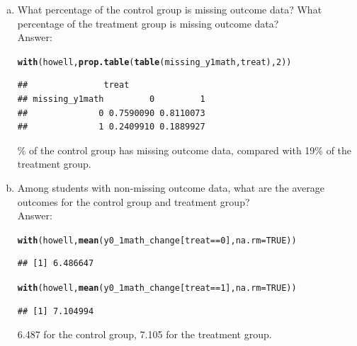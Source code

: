 \documentclass[11pt,notitlepage]{article}\usepackage[]{graphicx}\usepackage[]{color}
\makeatletter
\newcommand{\hlnum}[1]{\textcolor[rgb]{0.686,0.059,0.569}{#1}}%
\newcommand{\hlopt}[1]{\textcolor[rgb]{0,0,0}{#1}}%
\newcommand{\hlstd}[1]{\textcolor[rgb]{0.345,0.345,0.345}{#1}}%
\newcommand{\hlkwc}[1]{\textcolor[rgb]{0.333,0.667,0.333}{#1}}%
\newcommand{\hlkwd}[1]{\textcolor[rgb]{0.737,0.353,0.396}{\textbf{#1}}}%
\newenvironment{kframe}{%
 \def\at@end@of@kframe{}%
 \ifinner\ifhmode%
  \def\at@end@of@kframe{\end{minipage}}%
  \begin{minipage}{\columnwidth}%
 \fi\fi%
 \def\FrameCommand##1{\hskip\@totalleftmargin \hskip-\fboxsep
 \colorbox{shadecolor}{##1}\hskip-\fboxsep
     \hskip-\linewidth \hskip-\@totalleftmargin \hskip\columnwidth}%
 \MakeFramed {\advance\hsize-\width
   \@totalleftmargin\z@ \linewidth\hsize
   \@setminipage}}%
 {\par\unskip\endMakeFramed%
 \at@end@of@kframe}
\newenvironment{knitrout}{}{} %
\makeatother
\begin{document}
\begin{enumerate}[a)]
\item What percentage of the control group is missing outcome data? What percentage of the treatment group is missing outcome data?\\
Answer:\\
\begin{knitrout}
\color{fgcolor}\begin{kframe}
\begin{alltt}
\hlkwd{with}\hlstd{(howell,}\hlkwd{prop.table}\hlstd{(}\hlkwd{table}\hlstd{(missing_y1math, treat),} \hlnum{2}\hlstd{))}
\end{alltt}
\begin{verbatim}
##               treat
## missing_y1math         0         1
##              0 0.7590090 0.8110073
##              1 0.2409910 0.1889927
\end{verbatim}
\end{kframe}
\end{knitrout}
24\% of the control group has missing outcome data, compared with 19\% of the treatment group.

\item Among students with non-missing outcome data, what are the average outcomes for the control group and treatment group?\\
Answer:\\
\begin{knitrout}
\color{fgcolor}\begin{kframe}
\begin{alltt}
\hlkwd{with}\hlstd{(howell,} \hlkwd{mean}\hlstd{(y0_1math_change[treat}\hlopt{==}\hlnum{0}\hlstd{],}\hlkwc{na.rm}\hlstd{=}\hlnum{TRUE}\hlstd{))}
\end{alltt}
\begin{verbatim}
## [1] 6.486647
\end{verbatim}
\begin{alltt}
\hlkwd{with}\hlstd{(howell,} \hlkwd{mean}\hlstd{(y0_1math_change[treat}\hlopt{==}\hlnum{1}\hlstd{],}\hlkwc{na.rm}\hlstd{=}\hlnum{TRUE}\hlstd{))}
\end{alltt}
\begin{verbatim}
## [1] 7.104994
\end{verbatim}
\end{kframe}
\end{knitrout}


6.487 for the control group, 7.105 for the treatment group. 


\end{enumerate}
\end{document}
